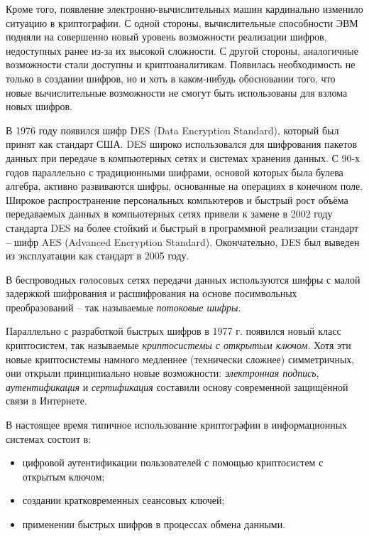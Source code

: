 Кроме того, появление электронно-вычислительных машин кардинально изменило ситуацию в криптографии. С одной стороны, вычислительные способности ЭВМ подняли на совершенно новый уровень возможности реализации шифров, недоступных ранее из-за их высокой сложности. С другой стороны, аналогичные возможности стали доступны и криптоаналитикам. Появилась необходимость не только в создании шифров, но и хоть в каком-нибудь обосновании того, что новые вычислительные возможности не смогут быть использованы для взлома новых шифров.

В 1976 году появился шифр DES (Data Encryption Standard), который был принят как стандарт США. DES широко использовался для шифрования пакетов данных при передаче в компьютерных сетях и системах хранения данных. С 90-х годов параллельно с традиционными шифрами, основой которых была булева алгебра, активно развиваются шифры, основанные на операциях в конечном поле. Широкое распространение персональных компьютеров и быстрый рост объёма передаваемых данных в компьютерных сетях привели к замене в 2002 году стандарта DES на более стойкий и быстрый в программной реализации стандарт -- шифр AES (Advanced Encryption Standard). Окончательно, DES был выведен из эксплуатации как стандарт в 2005 году.

В беспроводных голосовых сетях передачи данных используются шифры с малой задержкой шифрования и расшифрования на основе посимвольных преобразований -- так называемые \emph{потоковые шифры}.


Параллельно с разработкой быстрых шифров в 1977 г. появился новый класс криптосистем, так называемые \emph{криптосистемы с открытым ключом}. Хотя эти новые криптосистемы намного медленнее (технически сложнее) симметричных, они открыли принципиально новые возможности: \emph{электронная подпись}, \emph{аутентификация} и \emph{сертификация} составили основу современной защищённой связи в Интернете.

В настоящее время типичное использование криптографии в информационных системах состоит в:
\begin{itemize}
\item цифровой аутентификации пользователей с помощью криптосистем с открытым ключом;
\item создании кратковременных сеансовых ключей;
\item применении быстрых шифров в процессах обмена данными.
\end{itemize}
